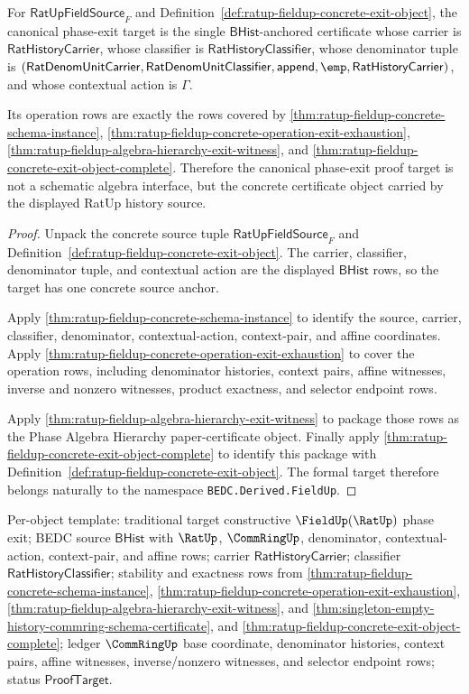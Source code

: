 \begin{theorem}
\label{thm:ratup-fieldup-canonical-machine-checkable-exit}
For $\mathsf{RatUpFieldSource}_F$ and
Definition~\ref{def:ratup-fieldup-concrete-exit-object}, the canonical
phase-exit target is the single $\mathsf{BHist}$-anchored certificate whose
carrier is $\mathsf{RatHistoryCarrier}$, whose classifier is
$\mathsf{RatHistoryClassifier}$, whose denominator tuple is
$(\mathsf{RatDenomUnitCarrier},\mathsf{RatDenomUnitClassifier},
\mathsf{append},\emp,\mathsf{RatHistoryCarrier})$, and whose contextual action
is $\Gamma$.

Its operation rows are exactly the rows covered by
\autoref{thm:ratup-fieldup-concrete-schema-instance},
\autoref{thm:ratup-fieldup-concrete-operation-exit-exhaustion},
\autoref{thm:ratup-fieldup-algebra-hierarchy-exit-witness}, and
\autoref{thm:ratup-fieldup-concrete-exit-object-complete}. Therefore the
canonical phase-exit proof target is not a schematic algebra interface, but the
concrete certificate object carried by the displayed RatUp history source.
\end{theorem}
\begin{proof}
Unpack the concrete source tuple $\mathsf{RatUpFieldSource}_F$ and
Definition~\ref{def:ratup-fieldup-concrete-exit-object}. The carrier,
classifier, denominator tuple, and contextual action are the displayed
$\mathsf{BHist}$ rows, so the target has one concrete source anchor.

Apply \autoref{thm:ratup-fieldup-concrete-schema-instance} to identify the
source, carrier, classifier, denominator, contextual-action, context-pair, and
affine coordinates. Apply
\autoref{thm:ratup-fieldup-concrete-operation-exit-exhaustion} to cover the
operation rows, including denominator histories, context pairs, affine
witnesses, inverse and nonzero witnesses, product exactness, and selector
endpoint rows.

Apply \autoref{thm:ratup-fieldup-algebra-hierarchy-exit-witness} to package
those rows as the Phase Algebra Hierarchy paper-certificate object. Finally
apply \autoref{thm:ratup-fieldup-concrete-exit-object-complete} to identify this
package with Definition~\ref{def:ratup-fieldup-concrete-exit-object}. The formal
target therefore belongs naturally to the namespace
\texttt{BEDC.Derived.FieldUp}.
\end{proof}

Per-object template: traditional target constructive
$\FieldUp(\RatUp)$ phase exit; BEDC source $\mathsf{BHist}$ with $\RatUp$,
$\CommRingUp$, denominator, contextual-action, context-pair, and affine rows;
carrier $\mathsf{RatHistoryCarrier}$; classifier
$\mathsf{RatHistoryClassifier}$; stability and exactness rows from
\autoref{thm:ratup-fieldup-concrete-schema-instance},
\autoref{thm:ratup-fieldup-concrete-operation-exit-exhaustion},
\autoref{thm:ratup-fieldup-algebra-hierarchy-exit-witness}, and
\autoref{thm:singleton-empty-history-commring-schema-certificate}, and
\autoref{thm:ratup-fieldup-concrete-exit-object-complete}; ledger
$\CommRingUp$ base coordinate, denominator histories, context pairs, affine
witnesses, inverse/nonzero witnesses, and selector endpoint rows; status
$\mathsf{ProofTarget}$.

